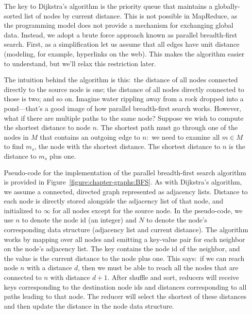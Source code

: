 The key to Dijkstra's algorithm is the priority queue that maintains a
globally-sorted list of nodes by current distance.  This is not
possible in MapReduce, as the programming model does not provide a
mechanism for exchanging global data.  Instead, we adopt a brute force
approach known as parallel breadth-first search.  First, as a
simplification let us assume that all edges have unit distance
(modeling, for example, hyperlinks on the web).  This makes the
algorithm easier to understand, but we'll relax this restriction
later.

The intuition behind the algorithm is this:\ the distance of all nodes
connected directly to the source node is one; the distance of all
nodes directly connected to those is two; and so on.  Imagine water
rippling away from a rock dropped into a pond---that's a good image of
how parallel breadth-first search works.  However, what if there are
multiple paths to the same node?  Suppose we wish to compute the
shortest distance to node $n$.  The shortest path must go through one
of the nodes in $M$ that contains an outgoing edge to $n$:\ we need to
examine all $m \in M$ to find $m_s$, the node with the shortest distance.
The shortest distance to $n$ is the distance to $m_s$ plus one.

Pseudo-code for the implementation of the parallel breadth-first
search algorithm is provided in
Figure~\ref{figure:chapter-graphs:BFS}.  As with Dijkstra's algorithm,
we assume a connected, directed graph represented as adjacency lists.
Distance to each node is directly stored alongside the adjacency list
of that node, and initialized to $\infty$ for all nodes except for the
source node.  In the pseudo-code, we use $n$ to denote the node id (an
integer) and $N$ to denote the node's corresponding data structure
(adjacency list and current distance).  The algorithm works by mapping
over all nodes and emitting a key-value pair for each neighbor on the
node's adjacency list.  The key contains the node id of the neighbor,
and the value is the current distance to the node plus one.  This
says:\ if we can reach node $n$ with a distance $d$, then we must be
able to reach all the nodes that are connected to $n$ with distance
$d+1$.  After shuffle and sort, reducers will receive keys
corresponding to the destination node ids and distances corresponding
to all paths leading to that node.  The reducer will select the
shortest of these distances and then update the distance in the node
data structure.

